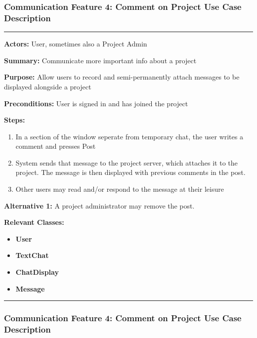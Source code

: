 \documentclass[twoside,letterpaper]{article}
\begin{document}
\subsubsection[Communication Feature 4: Comment on Project Use Case Description]{\rmfamily\bfseries\color{black}
	Communication Feature 4: Comment on Project Use Case Description}
\hypertarget{RefHeading22059017292}{}

\vspace{2pt}
\hrule
\vspace{8pt}
\textbf{Actors:} User, sometimes also a Project Admin \newline

\noindent\textbf{Summary:} Communicate more important info about a project  \newline

\noindent\textbf{Purpose:} Allow users to record and semi-permanently attach messages to be displayed alongside a project \newline

\noindent\textbf{Preconditions:} User is signed in and has joined the project \newline

\noindent\textbf{Steps:} \begin{enumerate}
	\item In a section of the window seperate from temporary chat, the user writes a comment and presses Post
	\item System sends that message to the project server, which attaches it to the project. The message is then displayed with previous comments in the post.
	\item Other users may read and/or respond to the message at their leisure
\end{enumerate}
\noindent\textbf{Alternative 1:} A project administrator may remove the post. \newline


\noindent\textbf{Relevant Classes:}
\begin{itemize}
	\item \textbf{User}
	\item \textbf{TextChat}
	\item \textbf{ChatDisplay}
	\item \textbf{Message}
\end{itemize}
\hrule
\newpage

\subsubsection[Communication Feature 5: Close chat Use Case Description]{\rmfamily\bfseries\color{black}
	Communication Feature 4: Comment on Project Use Case Description}
\hypertarget{RefHeading22059017292}{}
\end{document}
